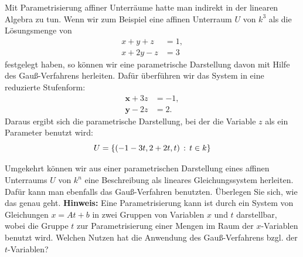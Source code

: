 \documentclass[11pt]{article}
\numberwithin{equation}{section}
\begin{document}
\begin{beispiel} 
Mit Parametrisierung affiner Unterräume hatte man indirekt in der linearen Algebra zu tun. Wenn wir zum Beispiel eine affinen Unterraum $U$ von $k^3$ als die Lösungsmenge von 
\begin{align*}
		x + y + z & = 1,
\\		x + 2y - z & = 3
\end{align*}
festgelegt haben, so können wir eine parametrische Darstellung davon mit Hilfe des Gauß-Verfahrens  herleiten. Dafür überführen wir das System in eine reduzierte Stufenform: 
\begin{align*}
		\textbf{x}+ 3 z & = -1,
\\		\textbf{y} - 2z & = 2.
\end{align*}
Daraus ergibt sich die parametrische Darstellung, bei der die Variable $z$ als ein Parameter benutzt wird: 
\[
	U = \left\{  (-1-3t,2 + 2t, t)  \,:\, t \in k \right\}
\] 
\end{beispiel} 

\begin{remark} 
Umgekehrt können wir aus einer parametrischen Darstellung eines affinen Unterraums $U$ von $k^n$ eine Beschreibung als lineares Gleichungssystem herleiten. Dafür kann man ebenfalls das Gauß-Verfahren benutzten. Überlegen Sie sich, wie das genau geht. \textbf{Hinweis:} Eine Parametrisierung kann ist durch ein System von Gleichungen $ x = A t + b$ in zwei Gruppen von Variablen $x$ und $t$ darstellbar, wobei die Gruppe $t$ zur Parametrisierung einer Mengen im Raum der $x$-Variablen benutzt wird. Welchen Nutzen hat die Anwendung des Gauß-Verfahrens bzgl. der $t$-Variablen? 
\end{remark} 
\end{document}
